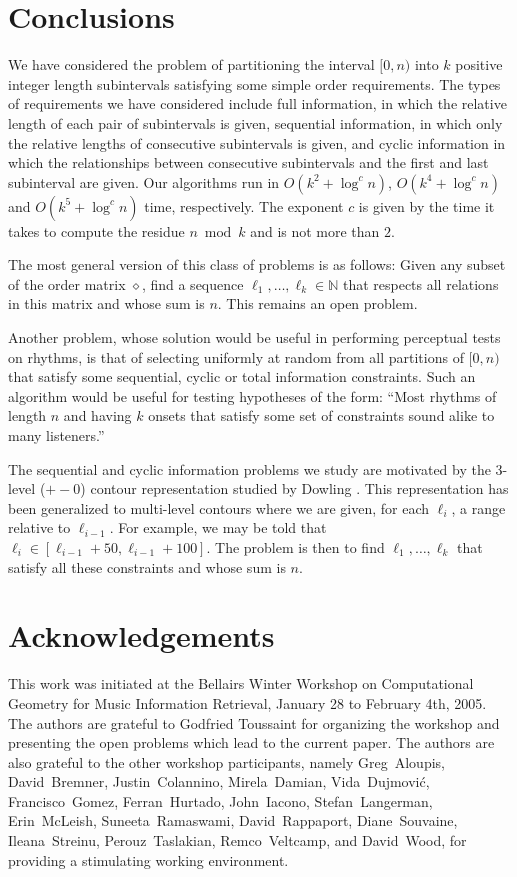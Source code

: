 \documentclass[11pt]{patmorin}
\newcommand{\N}{\mathbb{N}}
\newcommand{\op}{\diamond}
\begin{document}
\section{Conclusions}

We have considered the problem of partitioning the interval $[0,n)$
into $k$ positive integer length subintervals satisfying some simple
order requirements.  The types of requirements we have considered
include full information, in which the relative length of each pair of
subintervals is given, sequential information, in which only the
relative lengths of consecutive subintervals is given, and cyclic
information in which the relationships between consecutive
subintervals and the first and last subinterval are given.  Our
algorithms run in $O(k^2+\log^c n)$, $O(k^4+\log^c n)$ and
$O(k^5+\log^cn)$ time, respectively. The exponent $c$ is given
by the time it takes to compute the residue $n\bmod k$ and is not more
than $2$.

The most general version of this class of problems is as follows:
Given any subset of the order matrix $\op$, find a sequence
$\ell_1,\ldots,\ell_k\in\N$ that respects all relations in this matrix and
whose sum is $n$. This remains an open problem.

Another problem, whose solution would be useful in performing
perceptual tests on rhythms, is that of selecting uniformly at random
from all partitions of $[0,n)$ that satisfy some sequential, cyclic or
total information constraints.  Such an algorithm would be useful for
testing hypotheses of the form:  ``Most rhythms of length $n$ and
having $k$ onsets that satisfy some set of constraints sound alike to
many listeners.''

The sequential and cyclic information problems we study are motivated
by the 3-level ($+-0$) contour representation studied by Dowling
\cite{d78}.  This representation has been generalized to multi-level
contours \cite{l96,kcgv00} where we are given, for each $\ell_i$, a range
relative to $\ell_{i-1}$.  For example, we may be told that $\ell_{i}\in
[\ell_{i-1} + 50, \ell_{i-1}+100]$.  The problem is then to find
$\ell_1,\ldots,\ell_k$ that satisfy all these constraints and whose sum is
$n$.

\section*{Acknowledgements}

This work was initiated at the Bellairs Winter Workshop on
Computational Geometry for Music Information Retrieval, January 28 to
February 4th, 2005.  The authors are grateful to Godfried Toussaint
for organizing the workshop and presenting the open problems which
lead to the current paper.  The authors are also grateful to the other
workshop participants, namely 
Greg~Aloupis,
David~Bremner,
Justin~Colannino,
Mirela~Damian, 
Vida~Dujmovi\'c,
Francisco~Gomez,
Ferran~Hurtado, 
John~Iacono,
Stefan~Langerman,
Erin~McLeish,
Suneeta~Ramaswami,
David~Rappaport,
Diane~Souvaine,
Ileana~Streinu,
Perouz~Taslakian,
Remco~Veltcamp,
and David~Wood,
for providing a
stimulating working environment.



\end{document}
